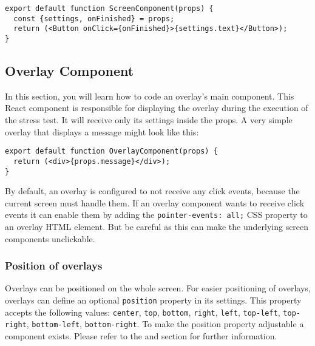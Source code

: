 \begin{verbatim}
export default function ScreenComponent(props) {
  const {settings, onFinished} = props;
  return (<Button onClick={onFinished}>{settings.text}</Button>);
}
\end{verbatim}

\subsection{Overlay Component}
\label{sec:development-overlays}
In this section, you will learn how to code an overlay's main component. 
This React component is responsible for displaying the overlay during the execution of the stress test. 
It will receive only its settings inside the props. 
A very simple overlay that displays a message might look like this:
\begin{verbatim}
export default function OverlayComponent(props) {
  return (<div>{props.message}</div>);
}
\end{verbatim}

By default, an overlay is configured to not receive any click events, because the current screen must handle them. 
If an overlay component wants to receive click events it can enable them by adding the \texttt{pointer-events: all;} CSS property to an overlay HTML element. 
But be careful as this can make the underlying screen components unclickable.

\subsubsection*{Position of overlays}
Overlays can be positioned on the whole screen. 
For easier positioning of overlays, overlays can define an optional \texttt{position} property in its settings. 
This property accepts the following values: 
\texttt{center}, \texttt{top}, \texttt{bottom}, \texttt{right}, \texttt{left}, \texttt{top-left}, \texttt{top-right}, \texttt{bottom-left}, \texttt{bottom-right}.
To make the position property adjustable a  component exists. 
Please refer to the  and  section for further information.

